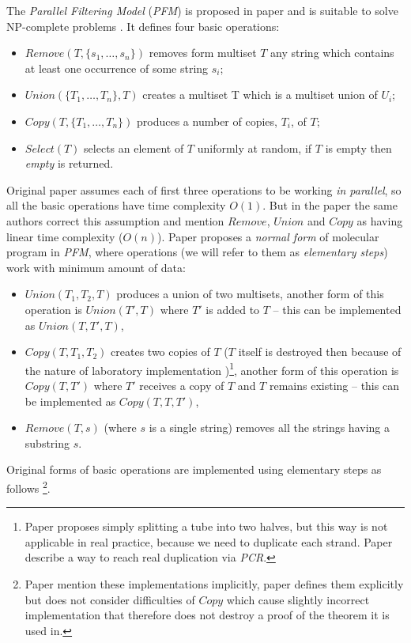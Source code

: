 The \emph{Parallel Filtering Model} (\emph{PFM}) is proposed in paper \cite{Amos:1996} and is suitable to solve NP-complete problems \cite{Amos:1996, Katsanyi:2003}. It defines four basic operations:
\begin{itemize}
	\item $Remove(T, \{s_1, \dots, s_n\})$ removes form multiset $T$ any string which contains at least one occurrence of some string $s_i$;
	\item $Union(\{T_1, \dots, T_n\}, T)$ creates a multiset T which is a multiset union of $U_i$;
	\item $Copy(T, \{T_1, \dots, T_n\})$ produces a number of copies, $T_i$, of $T$;
	\item $Select(T)$ selects an element of $T$ uniformly at random, if $T$ is empty then \emph{empty} is returned.
\end{itemize}
Original paper \cite{Amos:1996} assumes each of first three operations to be working \emph{in parallel}, so all the basic operations have time complexity $O(1)$. But in the paper \cite{Amos:1997} the same authors correct this assumption and mention $Remove$, $Union$ and $Copy$ as having linear time complexity ($O(n)$). 
Paper \cite{Katsanyi:2003} proposes a \emph{normal form} of molecular program in \emph{PFM}, where operations (we will refer to them as \emph{elementary steps}) work with minimum amount of data:
\begin{itemize}
	\item $Union(T_1, T_2, T)$ produces a union of two multisets, another form of this operation is $Union(T', T)$ where $T'$ is added to $T$ -- this can be implemented as $Union(T, T', T)$,
	\item $Copy(T, T_1, T_2)$ creates two copies of $T$ ($T$ itself is destroyed then because of the nature of laboratory implementation \cite{Amos:1996})\footnote{Paper \cite{Amos:1996} proposes simply splitting a tube into two halves, but this way is not applicable in real practice, because we need to duplicate each strand. Paper \cite{Adleman:1994} describe a way to reach real duplication via \emph{PCR}.}, another form of this operation is $Copy(T, T')$ where $T'$ receives a copy of $T$ and $T$ remains existing -- this can be implemented as $Copy(T, T, T')$,
	\item $Remove(T, s)$ (where $s$ is a single string) removes all the strings having a substring $s$.
\end{itemize}

Original forms of basic operations are implemented using elementary steps as follows \cite{Katsanyi:2003}\footnote{Paper \cite{Amos:1997} mention these implementations implicitly, paper \cite{Katsanyi:2003} defines them explicitly but does not consider difficulties of $Copy$ which cause slightly incorrect implementation that therefore does not destroy a proof of the theorem it is used in.}.

